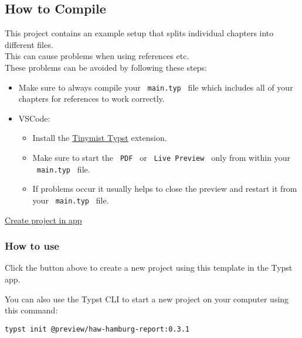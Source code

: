 \subsection{How to Compile}\label{how-to-compile}

This project contains an example setup that splits individual chapters
into different files.\\
This can cause problems when using references etc.\\
These problems can be avoided by following these steps:

\begin{itemize}
\tightlist
\item
  Make sure to always compile your \texttt{\ main.typ\ } file which
  includes all of your chapters for references to work correctly.
\item
  VSCode:

  \begin{itemize}
  \tightlist
  \item
    Install the
    \href{https://marketplace.visualstudio.com/items?itemName=myriad-dreamin.tinymist}{Tinymist
    Typst} extension.
  \item
    Make sure to start the \texttt{\ PDF\ } or
    \texttt{\ Live\ Preview\ } only from within your
    \texttt{\ main.typ\ } file.
  \item
    If problems occur it usually helps to close the preview and restart
    it from your \texttt{\ main.typ\ } file.
  \end{itemize}
\end{itemize}

\href{/app?template=haw-hamburg-report&version=0.3.1}{Create project in
app}

\subsubsection{How to use}\label{how-to-use}

Click the button above to create a new project using this template in
the Typst app.

You can also use the Typst CLI to start a new project on your computer
using this command:

\begin{verbatim}
typst init @preview/haw-hamburg-report:0.3.1
\end{verbatim}



